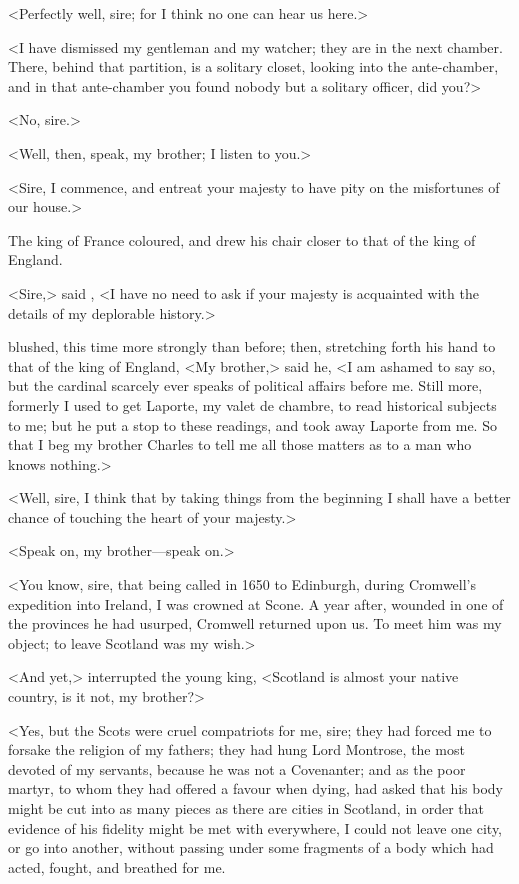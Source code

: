 <Perfectly well, sire; for I think no one can hear us here.>

<I have dismissed my gentleman and my watcher; they are in the next chamber. There, behind that partition, is a solitary closet, looking into the ante-chamber, and in that ante-chamber you found nobody but a solitary officer, did you?>

<No, sire.>

<Well, then, speak, my brother; I listen to you.>

<Sire, I commence, and entreat your majesty to have pity on the misfortunes of our house.>

The king of France coloured, and drew his chair closer to that of the king of England.

<Sire,> said , <I have no need to ask if your majesty is acquainted with the details of my deplorable history.>

 blushed, this time more strongly than before; then, stretching forth his hand to that of the king of England, <My brother,> said he, <I am ashamed to say so, but the cardinal scarcely ever speaks of political affairs before me. Still more, formerly I used to get Laporte, my valet de chambre, to read historical subjects to me; but he put a stop to these readings, and took away Laporte from me. So that I beg my brother Charles to tell me all those matters as to a man who knows nothing.>

<Well, sire, I think that by taking things from the beginning I shall have a better chance of touching the heart of your majesty.>

<Speak on, my brother—speak on.>

<You know, sire, that being called in 1650 to Edinburgh, during Cromwell's expedition into Ireland, I was crowned at Scone. A year after, wounded in one of the provinces he had usurped, Cromwell returned upon us. To meet him was my object; to leave Scotland was my wish.>

<And yet,> interrupted the young king, <Scotland is almost your native country, is it not, my brother?>

<Yes, but the Scots were cruel compatriots for me, sire; they had forced me to forsake the religion of my fathers; they had hung Lord Montrose, the most devoted of my servants, because he was not a Covenanter; and as the poor martyr, to whom they had offered a favour when dying, had asked that his body might be cut into as many pieces as there are cities in Scotland, in order that evidence of his fidelity might be met with everywhere, I could not leave one city, or go into another, without passing under some fragments of a body which had acted, fought, and breathed for me.

